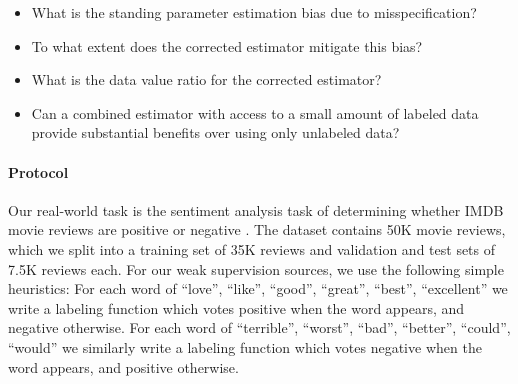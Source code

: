 \begin{itemize}
    \item What is the standing parameter estimation bias due to misspecification? 
    
    \item To what extent does the corrected estimator mitigate this bias?
    
    \item What is the data value ratio for the corrected estimator?  
    
    \item Can a combined estimator with access to a small amount of labeled data provide substantial benefits over using only unlabeled data?
\end{itemize}

\paragraph{Protocol} Our real-world task is the sentiment analysis task of determining whether IMDB movie reviews are positive or negative \citep{maas2011learning}. The dataset contains 50K movie reviews, which we split into a training set of 35K reviews and validation and test sets of 7.5K reviews each. For our weak supervision sources, we use the following simple heuristics: For each word    of ``love'', ``like'', ``good'', ``great'', ``best'', ``excellent'' we write a labeling function which votes positive when the word appears, and negative otherwise. For each word of ``terrible'', ``worst'', ``bad'', ``better'', ``could'', ``would'' we similarly write a labeling function which votes negative when the word appears, and positive otherwise.

